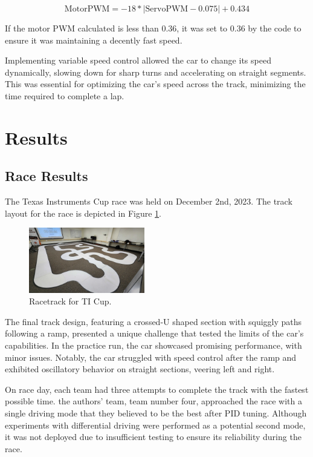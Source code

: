 \documentclass[conference]{IEEEtran}
\begin{document}
\begin{equation}
	\text{MotorPWM} = -18*|\text{ServoPWM} - 0.075| + 0.434 \label{eq:speed}
\end{equation}

If the motor PWM calculated is less than 0.36, it was set to 0.36 by the code to ensure it was maintaining a decently fast speed.

Implementing variable speed control allowed the car to change its speed dynamically, slowing down for sharp turns and accelerating on straight segments. This was essential for optimizing the car's speed across the track, minimizing the time required to complete a lap.

\section{Results}

\subsection{Race Results}

The Texas Instruments Cup race was held on December 2nd, 2023. The track layout for the race is depicted in Figure \ref{fig:track}.

\begin{figure}[htbp]
	\centerline{\includegraphics[width=0.45\textwidth]{images/track.jpg}}
	\caption{Racetrack for TI Cup.}
	\label{fig:track}
\end{figure}

The final track design, featuring a crossed-U shaped section with squiggly paths following a ramp, presented a unique challenge that tested the limits of the car's capabilities. In the practice run, the car showcased promising performance, with minor issues. Notably, the car struggled with speed control after the ramp and exhibited oscillatory behavior on straight sections, veering left and right.

On race day, each team had three attempts to complete the track with the fastest possible time. the authors' team, team number four, approached the race with a single driving mode that they believed to be the best after PID tuning. Although experiments with differential driving were performed as a potential second mode, it was not deployed due to insufficient testing to ensure its reliability during the race.
\end{document}
